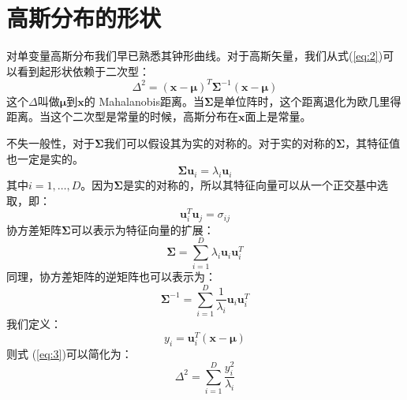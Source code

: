 \documentclass[10pt,a4paper,UTF8]{article}
\begin{document}
\section{高斯分布的形状}
\label{sec:orgb5579a7}


对单变量高斯分布我们早已熟悉其钟形曲线。对于高斯矢量，我们从式(\ref{eq:2})可以看到起形状依赖于二次型：
\begin{equation}
\label{eq:3}
\Delta^{2} = ( \mathbf{x} - \mathbf{\mu} )^{T} \mathbf{\Sigma}^{-1} ( \mathbf{x} - \mathbf{\mu} )
\end{equation}
这个\(\Delta\)叫做\(\mathbf{\mu}\)到\(\mathbf{x}\)的 Mahalanobis距离。当\(\mathbf{\Sigma}\)是单位阵时，这个距离退化为欧几里得距离。当这个二次型是常量的时候，高斯分布在\(\mathbf{x}\)面上是常量。

不失一般性，对于\(\mathbf{\Sigma}\)我们可以假设其为实的对称的。对于实的对称的\(\mathbf{\Sigma}\)，其特征值也一定是实的。
\begin{equation}
\label{eq:4}
\mathbf{\Sigma} \mathbf{u}_{i} = \lambda_{i} \mathbf{u}_{i}
\end{equation}
其中\(i=1,\ldots ,D\)。因为\(\mathbf{\Sigma}\)是实的对称的，所以其特征向量可以从一个正交基中选取，即：
\begin{equation}
\label{eq:5}
\mathbf{u}_{i}^{T} \mathbf{u}_{j} = \sigma_{ij}
\end{equation}
协方差矩阵\(\mathbf{\Sigma}\)可以表示为特征向量的扩展：
\begin{equation}
\label{eq:6}
\mathbf{\Sigma} = \sum_{i=1}^{D} \lambda_{i} \mathbf{u}_{i} \mathbf{u}_{i}^{T}
\end{equation}
同理，协方差矩阵的逆矩阵也可以表示为：
\begin{equation}
\label{eq:7}
\mathbf{\Sigma}^{-1} = \sum_{i=1}^{D}\frac{1}{\lambda_{i}}\mathbf{u}_{i} \mathbf{u}_{i}^{T}
\end{equation}
我们定义：
\begin{equation}
\label{eq:8}
y_{i} = \mathbf{u}_{i}^{T}( \mathbf{x} - \mathbf{\mu} )
\end{equation}
则式 (\ref{eq:3})可以简化为：
\begin{equation}
\label{eq:9}
\Delta^{2} = \sum_{i=1}^{D}\frac{y_{i}^{2}}{\lambda_{i}}
\end{equation}
\end{document}
